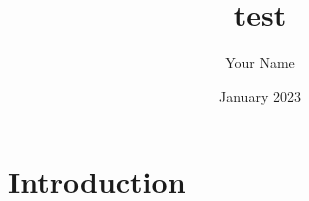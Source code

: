 \documentclass{article}
\title{test}
\author{Your Name }
\date{January 2023}
\begin{document}
\maketitle

\section{Introduction}
\end{document}
